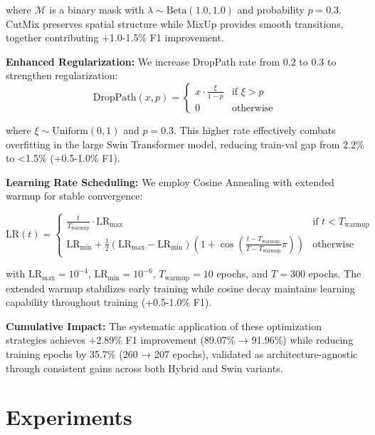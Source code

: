 \documentclass[journal]{IEEEtran}
\begin{document}
where $\mathcal{M}$ is a binary mask with $\lambda \sim \text{Beta}(1.0, 1.0)$ and probability $p=0.3$. CutMix preserves spatial structure while MixUp provides smooth transitions, together contributing +1.0-1.5\% F1 improvement.

\textbf{Enhanced Regularization:} We increase DropPath rate from 0.2 to 0.3 to strengthen regularization:
\begin{equation}
\text{DropPath}(x, p) = \begin{cases}
x \cdot \frac{\xi}{1-p} & \text{if } \xi > p \\
0 & \text{otherwise}
\end{cases}
\label{eq:droppath}
\end{equation}

where $\xi \sim \text{Uniform}(0,1)$ and $p=0.3$. This higher rate effectively combats overfitting in the large Swin Transformer model, reducing train-val gap from 2.2\% to <1.5\% (+0.5-1.0\% F1).

\textbf{Learning Rate Scheduling:} We employ Cosine Annealing with extended warmup for stable convergence:

\begin{equation}
\text{LR}(t) = \begin{cases}
\frac{t}{T_{\text{warmup}}} \cdot \text{LR}_{\text{max}} & \text{if } t < T_{\text{warmup}} \\
\text{LR}_{\text{min}} + \frac{1}{2}(\text{LR}_{\text{max}} - \text{LR}_{\text{min}})\left(1 + \cos\left(\frac{t-T_{\text{warmup}}}{T-T_{\text{warmup}}}\pi\right)\right) & \text{otherwise}
\end{cases}
\label{eq:cosine}
\end{equation}

with $\text{LR}_{\text{max}}=10^{-4}$, $\text{LR}_{\text{min}}=10^{-6}$, $T_{\text{warmup}}=10$ epochs, and $T=300$ epochs. The extended warmup stabilizes early training while cosine decay maintains learning capability throughout training (+0.5-1.0\% F1).

\textbf{Cumulative Impact:} The systematic application of these optimization strategies achieves +2.89\% F1 improvement (89.07\% → 91.96\%) while reducing training epochs by 35.7\% (260 → 207 epochs), validated as architecture-agnostic through consistent gains across both Hybrid and Swin variants.

\section{Experiments}
\end{document}
